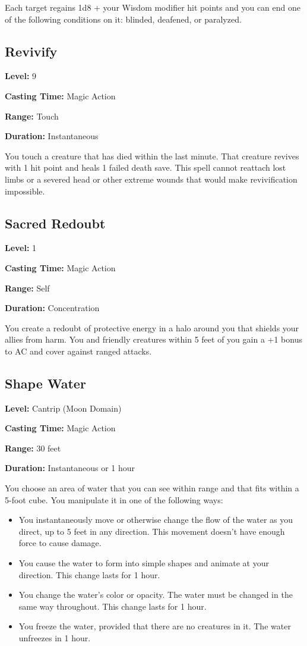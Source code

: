 \documentclass[12pt,letterpaper,twocolumn,openany,nodeprecatedcode,bg=none]{dndbook}
\providecommand{\tightlist}{%
  \setlength{\itemsep}{0pt}\setlength{\parskip}{0pt}}
\begin{document}
Each target regains 1d8 + your Wisdom modifier hit points and you can
end one of the following conditions on it: blinded, deafened, or
paralyzed.

\subsection{Revivify}\label{revivify}

\textbf{Level:} 9

\textbf{Casting Time:} Magic Action

\textbf{Range:} Touch

\textbf{Duration:} Instantaneous

You touch a creature that has died within the last minute. That creature
revives with 1 hit point and heals 1 failed death save. This spell
cannot reattach lost limbs or a severed head or other extreme wounds
that would make revivification impossible.

\subsection{Sacred Redoubt}\label{sacred-redoubt}

\textbf{Level:} 1

\textbf{Casting Time:} Magic Action

\textbf{Range:} Self

\textbf{Duration:} Concentration

You create a redoubt of protective energy in a halo around you that
shields your allies from harm. You and friendly creatures within 5 feet
of you gain a +1 bonus to AC and cover against ranged attacks.

\subsection{Shape Water}\label{shape-water}

\textbf{Level:} Cantrip (Moon Domain)

\textbf{Casting Time:} Magic Action

\textbf{Range:} 30 feet

\textbf{Duration:} Instantaneous or 1 hour

You choose an area of water that you can see within range and that fits
within a 5-foot cube. You manipulate it in one of the following ways:

\begin{itemize}
\tightlist
\item
  You instantaneously move or otherwise change the flow of the water as
  you direct, up to 5 feet in any direction. This movement doesn't have
  enough force to cause damage.
\item
  You cause the water to form into simple shapes and animate at your
  direction. This change lasts for 1 hour.
\item
  You change the water's color or opacity. The water must be changed in
  the same way throughout. This change lasts for 1 hour.
\item
  You freeze the water, provided that there are no creatures in it. The
  water unfreezes in 1 hour.
\end{itemize}
\end{document}
